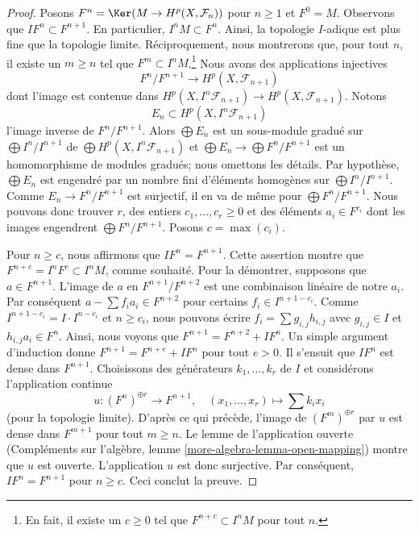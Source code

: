 {\begin{proof}

Posons $F^n = \Ker(M \to H^p(X, \mathcal{F}_n))$ pour $n \geq 1$ et $F^0 = M$. Observons que $I F^n \subset F^{n + 1}$. En particulier, $I^n M \subset F^n$. Ainsi, la topologie $I$-adique est plus fine que la topologie limite. Réciproquement, nous montrerons que, pour tout $n$,
il existe un $m \geq n$ tel que $F^m \subset I^nM$.\footnote{En fait, il existe un $c \geq 0$ tel que $F^{n + c} \subset I^nM$ pour tout $n$.} Nous avons des applications injectives
$$
F^n/F^{n + 1} \longrightarrow H^p(X, \mathcal{F}_{n + 1})
$$
dont l'image est contenue dans
$H^p(X, I^n\mathcal{F}_{n + 1}) \to H^p(X, \mathcal{F}_{n + 1})$. Notons
$$
E_n \subset H^p(X, I^n\mathcal{F}_{n + 1})
$$
l'image inverse de $F^n/F^{n + 1}$. Alors $\bigoplus E_n$ est un sous-module gradué sur $\bigoplus I^n/I^{n + 1}$ de
$\bigoplus H^p(X, I^n\mathcal{F}_{n + 1})$ et
$\bigoplus E_n \to \bigoplus F^n/F^{n + 1}$ est un homomorphisme de modules gradués; nous omettons les détails. Par hypothèse, $\bigoplus E_n$ est engendré par un nombre fini d'éléments homogènes sur $\bigoplus I^n/I^{n + 1}$. Comme $E_n \to F^n/F^{n + 1}$ est surjectif, il en va de même pour $\bigoplus F^n/F^{n + 1}$. Nous pouvons donc trouver $r$, des entiers $c_1, \ldots, c_r \geq 0$ et
des éléments $a_i \in F^{c_i}$ dont les images engendrent $\bigoplus F^n/F^{n + 1}$. Posons $c = \max(c_i)$.

\medskip\noindent

Pour $n \geq c$, nous affirmons que $I F^n = F^{n + 1}$. Cette assertion montre que
$F^{n + c} = I^nF^c \subset I^nM$, comme souhaité. Pour la démontrer, supposons que $a \in F^{n + 1}$. L'image de
$a$ en $F^{n + 1}/F^{n + 2}$ est une combinaison linéaire de notre $a_i$. Par conséquent $a  - \sum f_i a_i \in F^{n + 2}$
pour certains $f_i \in I^{n + 1 - c_i}$. Comme
$I^{n + 1 - c_i} = I \cdot I^{n - c_i}$ et $n \geq c_i$, nous pouvons écrire
$f_i = \sum g_{i, j} h_{i, j}$ avec $g_{i, j} \in I$
et $h_{i, j}a_i \in F^n$. Ainsi, nous voyons que
$F^{n + 1} = F^{n + 2} + IF^n$. Un simple argument d'induction donne $F^{n + 1} = F^{n + e} + IF^n$
pour tout $e > 0$. Il s'ensuit que $IF^n$ est dense dans $F^{n + 1}$. Choisissons des générateurs $k_1, \ldots, k_r$ de $I$ et considérons l'application continue
$$
u : (F^n)^{\oplus r} \longrightarrow F^{n + 1},\quad
(x_1, \ldots, x_r) \mapsto \sum k_i x_i
$$
(pour la topologie limite). D'après ce qui précède, l'image de $(F^m)^{\oplus r}$ par $u$ est dense dans
$F^{m + 1}$ pour tout $m \geq n$. Le lemme de l'application ouverte (Compléments sur l'algèbre, lemme \ref{more-algebra-lemma-open-mapping}) montre que $u$ est ouverte. L'application $u$ est donc surjective. Par conséquent, $IF^n = F^{n + 1}$
pour $n \geq c$. Ceci conclut la preuve.


\end{proof}}
